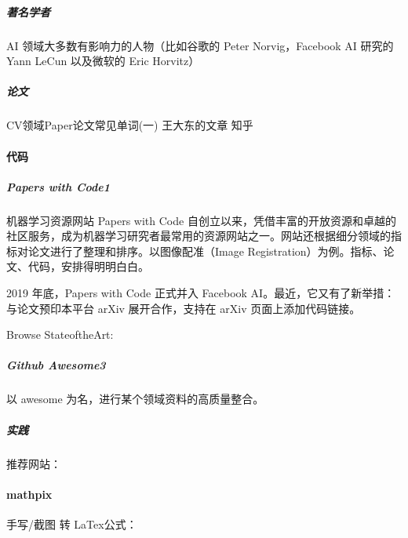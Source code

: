 \documentclass[letterpaper,10pt,english]{sphinxmanual}
\begin{document}


\subparagraph{著名学者}
\label{\detokenize{chapter_knowledge/research:id6}}\label{\detokenize{chapter_knowledge/research:id7}}
AI 领域大多数有影响力的人物（比如谷歌的 Peter Norvig，Facebook AI 研究的
Yann LeCun 以及微软的 Eric Horvitz）


\subparagraph{论文}
\label{\detokenize{chapter_knowledge/research:id8}}

CV领域Paper论文常见单词(一) \sphinxhyphen{} 王大东的文章 \sphinxhyphen{} 知乎



\paragraph{代码}
\label{\detokenize{chapter_knowledge/research:id9}}

\subparagraph{Papers with Code1\sphinxfootnotemark[683]}
\label{\detokenize{chapter_knowledge/research:papers-with-code1}}%
\begin{footnotetext}[683]\sphinxAtStartFootnote
{}
%
\end{footnotetext}\ignorespaces 
机器学习资源网站 Papers with Code
自创立以来，凭借丰富的开放资源和卓越的社区服务，成为机器学习研究者最常用的资源网站之一。网站还根据细分领域的指标对论文进行了整理和排序。以图像配准（Image
Registration）为例。指标、论文、代码，安排得明明白白。

2019 年底，Papers with Code 正式并入 Facebook
AI。最近，它又有了新举措：与论文预印本平台 arXiv 展开合作，支持在 arXiv
页面上添加代码链接。

Browse State\sphinxhyphen{}of\sphinxhyphen{}the\sphinxhyphen{}Art: 


\subparagraph{Github \sphinxhyphen{} Awesome3}
\label{\detokenize{chapter_knowledge/research:github-awesome3}}
以 awesome 为名，进行某个领域资料的高质量整合。


\subparagraph{实践}
\label{\detokenize{chapter_knowledge/research:id10}}
推荐网站：


\paragraph{mathpix}
\label{\detokenize{chapter_knowledge/research:mathpix}}
手写/截图 转 LaTex公式：
\end{document}
